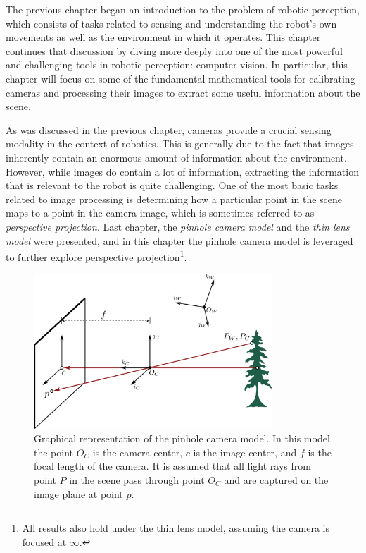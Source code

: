 The previous chapter began an introduction to the problem of robotic perception, which consists of tasks related to sensing and understanding the robot's own movements as well as the environment in which it operates\cite{SiegwartNourbakhshEtAl2011}. This chapter continues that discussion by diving more deeply into one of the most powerful and challenging tools in robotic perception: computer vision. In particular, this chapter will focus on some of the fundamental mathematical tools for calibrating cameras and processing their images to extract some useful information about the scene\cite{ForsythPonce2011}\cite{HartleyZisserman2002}\nocite{Tsai1987}.
\nocite{Bradski2000}

As was discussed in the previous chapter, cameras provide a crucial sensing modality in the context of robotics. This is generally due to the fact that images inherently contain an enormous amount of information about the environment. However, while images do contain a lot of information, extracting the information that is relevant to the robot is quite challenging. One of the most basic tasks related to image processing is determining how a particular point in the scene maps to a point in the camera image, which is sometimes referred to as \textit{perspective projection}. Last chapter, the \textit{pinhole camera model} and the \textit{thin lens model} were presented, and in this chapter the pinhole camera model is leveraged to further explore perspective projection\footnote{All results also hold under the thin lens model, assuming the camera is focused at $\infty$.}.

\begin{figure}[ht]
\includegraphics[width=0.8\textwidth]{tex/figs/ch09_figs/pinholecamera2.png}
\centering
\caption{Graphical representation of the pinhole camera model. In this model the point $O_C$ is the camera center, $c$ is the image center, and $f$ is the focal length of the camera. It is assumed that all light rays from point $P$ in the scene pass through point $O_C$ and are captured on the image plane at point $p$.}
\label{fig:pinhole_cam}
\end{figure}

